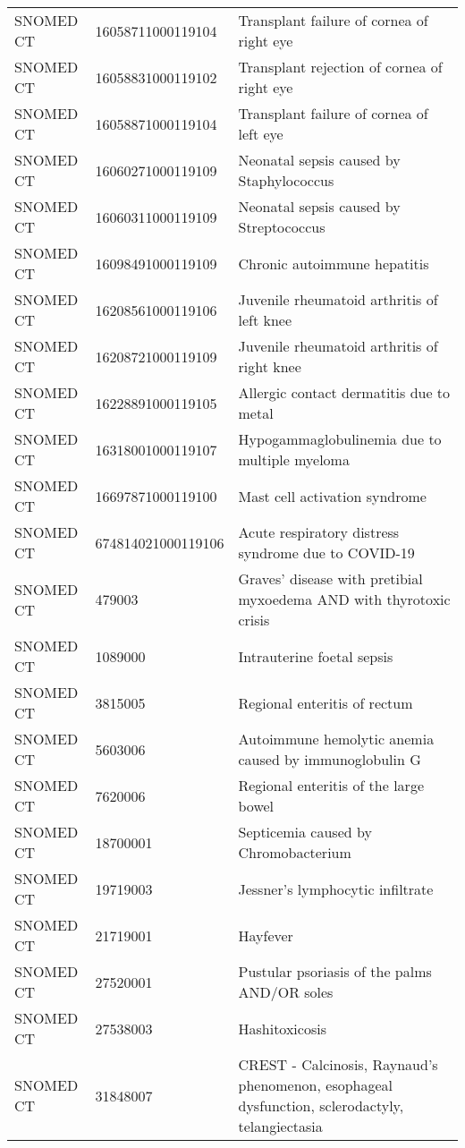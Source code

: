 \begin{longtable}{p{}p{}p{}}
  SNOMED CT & 16058711000119104 & Transplant failure of cornea of right eye \\ 
  SNOMED CT & 16058831000119102 & Transplant rejection of cornea of right eye \\ 
  SNOMED CT & 16058871000119104 & Transplant failure of cornea of left eye \\ 
  SNOMED CT & 16060271000119109 & Neonatal sepsis caused by Staphylococcus \\ 
  SNOMED CT & 16060311000119109 & Neonatal sepsis caused by Streptococcus \\ 
  SNOMED CT & 16098491000119109 & Chronic autoimmune hepatitis \\ 
  SNOMED CT & 16208561000119106 & Juvenile rheumatoid arthritis of left knee \\ 
  SNOMED CT & 16208721000119109 & Juvenile rheumatoid arthritis of right knee \\ 
  SNOMED CT & 16228891000119105 & Allergic contact dermatitis due to metal \\ 
  SNOMED CT & 16318001000119107 & Hypogammaglobulinemia due to multiple myeloma \\ 
  SNOMED CT & 16697871000119100 & Mast cell activation syndrome \\ 
  SNOMED CT & 674814021000119106 & Acute respiratory distress syndrome due to COVID-19 \\ 
  SNOMED CT & 479003 & Graves' disease with pretibial myxoedema AND with thyrotoxic crisis \\ 
  SNOMED CT & 1089000 & Intrauterine foetal sepsis \\ 
  SNOMED CT & 3815005 & Regional enteritis of rectum \\ 
  SNOMED CT & 5603006 & Autoimmune hemolytic anemia caused by immunoglobulin G \\ 
  SNOMED CT & 7620006 & Regional enteritis of the large bowel \\ 
  SNOMED CT & 18700001 & Septicemia caused by Chromobacterium \\ 
  SNOMED CT & 19719003 & Jessner's lymphocytic infiltrate \\ 
  SNOMED CT & 21719001 & Hayfever \\ 
  SNOMED CT & 27520001 & Pustular psoriasis of the palms AND/OR soles \\ 
  SNOMED CT & 27538003 & Hashitoxicosis \\ 
  SNOMED CT & 31848007 & CREST - Calcinosis, Raynaud's phenomenon, esophageal dysfunction, sclerodactyly, telangiectasia \\ 

\end{longtable}
